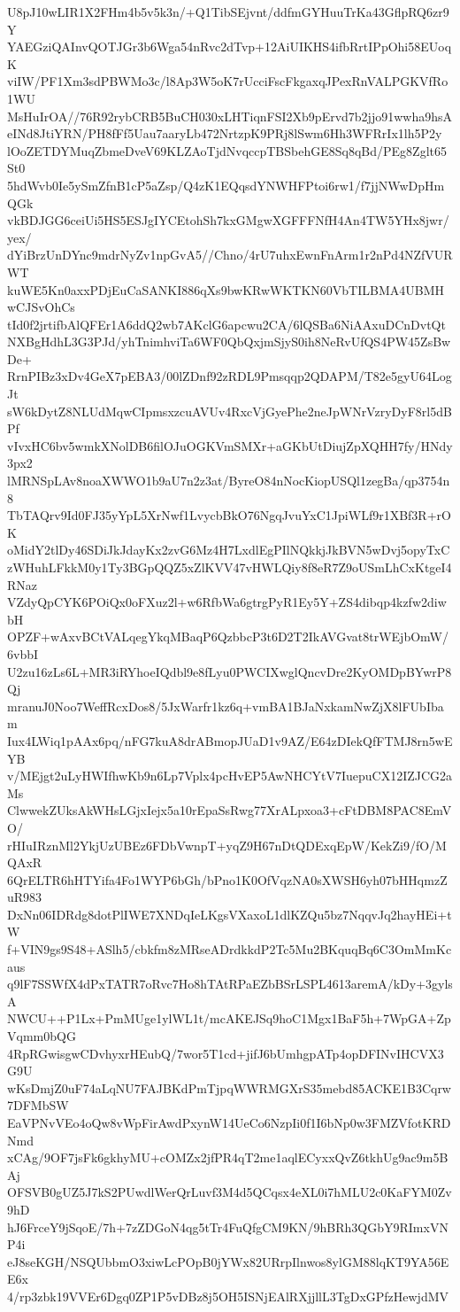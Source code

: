 U8pJ10wLIR1X2FHm4b5v5k3n/+Q1TibSEjvnt/ddfmGYHuuTrKa43GflpRQ6zr9Y
YAEGziQAInvQOTJGr3b6Wga54nRvc2dTvp+12AiUIKHS4ifbRrtIPpOhi58EUoqK
viIW/PF1Xm3sdPBWMo3c/l8Ap3W5oK7rUcciFscFkgaxqJPexRnVALPGKVfRo1WU
MsHuIrOA//76R92rybCRB5BuCH030xLHTiqnFSI2Xb9pErvd7b2jjo91wwha9hsA
eINd8JtiYRN/PH8fFf5Uau7aaryLb472NrtzpK9PRj8lSwm6Hh3WFRrIx1lh5P2y
lOoZETDYMuqZbmeDveV69KLZAoTjdNvqccpTBSbehGE8Sq8qBd/PEg8Zglt65St0
5hdWvb0Ie5ySmZfnB1cP5aZsp/Q4zK1EQqsdYNWHFPtoi6rw1/f7jjNWwDpHmQGk
vkBDJGG6ceiUi5HS5ESJgIYCEtohSh7kxGMgwXGFFFNfH4An4TW5YHx8jwr/yex/
dYiBrzUnDYnc9mdrNyZv1npGvA5//Chno/4rU7uhxEwnFnArm1r2nPd4NZfVURWT
kuWE5Kn0axxPDjEuCaSANKI886qXs9bwKRwWKTKN60VbTILBMA4UBMHwCJSvOhCs
tId0f2jrtifbAlQFEr1A6ddQ2wb7AKclG6apcwu2CA/6lQSBa6NiAAxuDCnDvtQt
NXBgHdhL3G3PJd/yhTnimhviTa6WF0QbQxjmSjyS0ih8NeRvUfQS4PW45ZsBwDe+
RrnPIBz3xDv4GeX7pEBA3/00lZDnf92zRDL9Pmsqqp2QDAPM/T82e5gyU64LogJt
sW6kDytZ8NLUdMqwCIpmsxzcuAVUv4RxcVjGyePhe2neJpWNrVzryDyF8rl5dBPf
vIvxHC6bv5wmkXNolDB6filOJuOGKVmSMXr+aGKbUtDiujZpXQHH7fy/HNdy3px2
lMRNSpLAv8noaXWWO1b9aU7n2z3at/ByreO84nNocKiopUSQl1zegBa/qp3754n8
TbTAQrv9Id0FJ35yYpL5XrNwf1LvycbBkO76NgqJvuYxC1JpiWLf9r1XBf3R+rOK
oMidY2tlDy46SDiJkJdayKx2zvG6Mz4H7LxdlEgPIlNQkkjJkBVN5wDvj5opyTxC
zWHuhLFkkM0y1Ty3BGpQQZ5xZlKVV47vHWLQiy8f8eR7Z9oUSmLhCxKtgeI4RNaz
VZdyQpCYK6POiQx0oFXuz2l+w6RfbWa6gtrgPyR1Ey5Y+ZS4dibqp4kzfw2diwbH
OPZF+wAxvBCtVALqegYkqMBaqP6QzbbcP3t6D2T2IkAVGvat8trWEjbOmW/6vbbI
U2zu16zLs6L+MR3iRYhoeIQdbl9e8fLyu0PWCIXwglQncvDre2KyOMDpBYwrP8Qj
mranuJ0Noo7WeffRcxDos8/5JxWarfr1kz6q+vmBA1BJaNxkamNwZjX8lFUbIbam
Iux4LWiq1pAAx6pq/nFG7kuA8drABmopJUaD1v9AZ/E64zDIekQfFTMJ8rn5wEYB
v/MEjgt2uLyHWIfhwKb9n6Lp7Vplx4pcHvEP5AwNHCYtV7IuepuCX12IZJCG2aMs
ClwwekZUksAkWHsLGjxIejx5a10rEpaSsRwg77XrALpxoa3+cFtDBM8PAC8EmVO/
rHIuIRznMl2YkjUzUBEz6FDbVwnpT+yqZ9H67nDtQDExqEpW/KekZi9/fO/MQAxR
6QrELTR6hHTYifa4Fo1WYP6bGh/bPno1K0OfVqzNA0sXWSH6yh07bHHqmzZuR983
DxNn06IDRdg8dotPlIWE7XNDqIeLKgsVXaxoL1dlKZQu5bz7NqqvJq2hayHEi+tW
f+VIN9gs9S48+ASlh5/cbkfm8zMRseADrdkkdP2Tc5Mu2BKquqBq6C3OmMmKcaus
q9lF7SSWfX4dPxTATR7oRvc7Ho8hTAtRPaEZbBSrLSPL4613aremA/kDy+3gylsA
NWCU++P1Lx+PmMUge1ylWL1t/mcAKEJSq9hoC1Mgx1BaF5h+7WpGA+ZpVqmm0bQG
4RpRGwisgwCDvhyxrHEubQ/7wor5T1cd+jifJ6bUmhgpATp4opDFINvIHCVX3G9U
wKsDmjZ0uF74aLqNU7FAJBKdPmTjpqWWRMGXrS35mebd85ACKE1B3Cqrw7DFMbSW
EaVPNvVEo4oQw8vWpFirAwdPxynW14UeCo6NzpIi0f1I6bNp0w3FMZVfotKRDNmd
xCAg/9OF7jsFk6gkhyMU+cOMZx2jfPR4qT2me1aqlECyxxQvZ6tkhUg9ac9m5BAj
OFSVB0gUZ5J7kS2PUwdlWerQrLuvf3M4d5QCqsx4eXL0i7hMLU2c0KaFYM0Zv9hD
hJ6FrceY9jSqoE/7h+7zZDGoN4qg5tTr4FuQfgCM9KN/9hBRh3QGbY9RImxVNP4i
eJ8seKGH/NSQUbbmO3xiwLcPOpB0jYWx82URrpIlnwos8ylGM88lqKT9YA56EE6x
4/rp3zbk19VVEr6Dgq0ZP1P5vDBz8j5OH5ISNjEAlRXjjllL3TgDxGPfzHewjdMV
